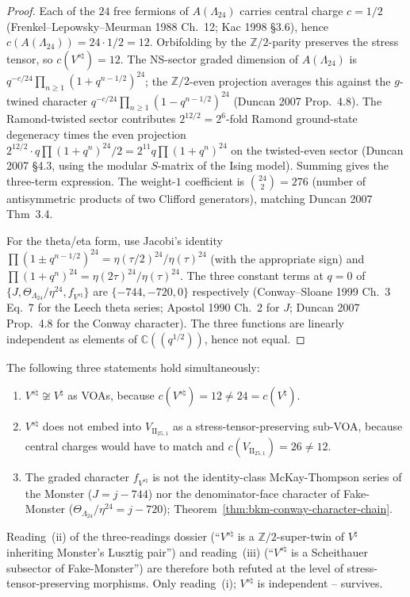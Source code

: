 \begin{proof}
Each of the $24$ free fermions of $A(\Lambda_{24})$ carries central charge
$c = 1/2$ (Frenkel--Lepowsky--Meurman 1988 Ch.~12; Kac 1998 \S3.6), hence
$c(A(\Lambda_{24})) = 24 \cdot 1/2 = 12$. Orbifolding by the
$\mathbb{Z}/2$-parity preserves the stress tensor, so
$c(V^{s\natural}) = 12$. The NS-sector graded dimension of
$A(\Lambda_{24})$ is $q^{-c/24}\prod_{n\ge 1}(1+q^{n-1/2})^{24}$; the
$\mathbb{Z}/2$-even projection averages this against the
$g$-twined character $q^{-c/24}\prod_{n\ge 1}(1-q^{n-1/2})^{24}$
(Duncan 2007 Prop.~4.8). The Ramond-twisted sector contributes
$2^{12/2} = 2^6$-fold Ramond ground-state degeneracy times the
even projection $2^{12/2}\cdot q\prod(1+q^n)^{24}/2 = 2^{11}q\prod(1+q^n)^{24}$
on the twisted-even sector (Duncan 2007 \S4.3, using the modular
$S$-matrix of the Ising model). Summing gives the three-term
expression. The weight-$1$ coefficient is
$\binom{24}{2} = 276$ (number of antisymmetric products of two
Clifford generators), matching Duncan 2007 Thm~3.4.

For the theta/eta form, use Jacobi's identity
$\prod(1\pm q^{n-1/2})^{24} = \eta(\tau/2)^{24}/\eta(\tau)^{24}$
(with the appropriate sign) and $\prod(1+q^n)^{24} =
\eta(2\tau)^{24}/\eta(\tau)^{24}$. The three constant terms at
$q = 0$ of $\{J,\Theta_{\Lambda_{24}}/\eta^{24}, f_{V^{s\natural}}\}$
are $\{-744,-720,0\}$ respectively (Conway--Sloane 1999 Ch.~3 Eq.~7
for the Leech theta series; Apostol 1990 Ch.~2 for $J$;
Duncan 2007 Prop.~4.8 for the Conway character). The three functions
are linearly independent as elements of $\mathbb{C}((q^{1/2}))$,
hence not equal.
\end{proof}

\begin{corollary}
\label{cor:bkm-conway-not-monster-not-fakemonster}
The following three statements hold simultaneously:
\begin{enumerate}[label=\textup{(\roman*)}]
\item $V^{s\natural}\not\cong V^\natural$ as VOAs, because
$c(V^{s\natural}) = 12\ne 24 = c(V^\natural)$.
\item $V^{s\natural}$ does not embed into $V_{\mathrm{II}_{25,1}}$
as a stress-tensor-preserving sub-VOA, because central charges
would have to match and $c(V_{\mathrm{II}_{25,1}}) = 26 \ne 12$.
\item The graded character $f_{V^{s\natural}}$ is not the
identity-class McKay-Thompson series of the Monster
($J = j - 744$) nor the denominator-face character of Fake-Monster
($\Theta_{\Lambda_{24}}/\eta^{24} = j - 720$);
Theorem~\ref{thm:bkm-conway-character-chain}.
\end{enumerate}
Reading~(ii) of the three-readings dossier
(``$V^{s\natural}$ is a $\mathbb{Z}/2$-super-twin of $V^\natural$
inheriting Monster's Lusztig pair'') and reading~(iii)
(``$V^{s\natural}$ is a Scheithauer subsector of Fake-Monster'')
are therefore both refuted at the level of stress-tensor-preserving
morphisms. Only reading~(i); $V^{s\natural}$ is independent --
survives.
\end{corollary}

